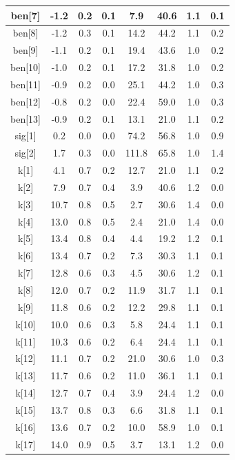 \begin{longtable}{|c|c|c|c|c|c|c|c|}
\hline
ben[7] & -1.2 & 0.2 & 0.1 & 7.9 & 40.6 & 1.1 & 0.1 \\
\hline
ben[8] & -1.2 & 0.3 & 0.1 & 14.2 & 44.2 & 1.1 & 0.2 \\
\hline
ben[9] & -1.1 & 0.2 & 0.1 & 19.4 & 43.6 & 1.0 & 0.2 \\
\hline
ben[10] & -1.0 & 0.2 & 0.1 & 17.2 & 31.8 & 1.0 & 0.2 \\
\hline
ben[11] & -0.9 & 0.2 & 0.0 & 25.1 & 44.2 & 1.0 & 0.3 \\
\hline
ben[12] & -0.8 & 0.2 & 0.0 & 22.4 & 59.0 & 1.0 & 0.3 \\
\hline
ben[13] & -0.9 & 0.2 & 0.1 & 13.1 & 21.0 & 1.1 & 0.2 \\
\hline
sig[1] & 0.2 & 0.0 & 0.0 & 74.2 & 56.8 & 1.0 & 0.9 \\
\hline
sig[2] & 1.7 & 0.3 & 0.0 & 111.8 & 65.8 & 1.0 & 1.4 \\
\hline
k[1] & 4.1 & 0.7 & 0.2 & 12.7 & 21.0 & 1.1 & 0.2 \\
\hline
k[2] & 7.9 & 0.7 & 0.4 & 3.9 & 40.6 & 1.2 & 0.0 \\
\hline
k[3] & 10.7 & 0.8 & 0.5 & 2.7 & 30.6 & 1.4 & 0.0 \\
\hline
k[4] & 13.0 & 0.8 & 0.5 & 2.4 & 21.0 & 1.4 & 0.0 \\
\hline
k[5] & 13.4 & 0.8 & 0.4 & 4.4 & 19.2 & 1.2 & 0.1 \\
\hline
k[6] & 13.4 & 0.7 & 0.2 & 7.3 & 30.3 & 1.1 & 0.1 \\
\hline
k[7] & 12.8 & 0.6 & 0.3 & 4.5 & 30.6 & 1.2 & 0.1 \\
\hline
k[8] & 12.0 & 0.7 & 0.2 & 11.9 & 31.7 & 1.1 & 0.1 \\
\hline
k[9] & 11.8 & 0.6 & 0.2 & 12.2 & 29.8 & 1.1 & 0.1 \\
\hline
k[10] & 10.0 & 0.6 & 0.3 & 5.8 & 24.4 & 1.1 & 0.1 \\
\hline
k[11] & 10.3 & 0.6 & 0.2 & 6.4 & 24.4 & 1.1 & 0.1 \\
\hline
k[12] & 11.1 & 0.7 & 0.2 & 21.0 & 30.6 & 1.0 & 0.3 \\
\hline
k[13] & 11.7 & 0.6 & 0.2 & 11.0 & 36.1 & 1.1 & 0.1 \\
\hline
k[14] & 12.7 & 0.7 & 0.4 & 3.9 & 24.4 & 1.2 & 0.0 \\
\hline
k[15] & 13.7 & 0.8 & 0.3 & 6.6 & 31.8 & 1.1 & 0.1 \\
\hline
k[16] & 13.6 & 0.7 & 0.2 & 10.0 & 58.9 & 1.0 & 0.1 \\
\hline
k[17] & 14.0 & 0.9 & 0.5 & 3.7 & 13.1 & 1.2 & 0.0 \\

\end{longtable}
